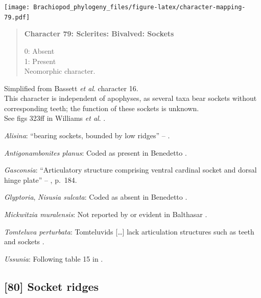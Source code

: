 \documentclass[openany]{book}
\begin{document}
\texttt{[image: Brachiopod\_phylogeny\_files/figure-latex/character-mapping-79.pdf]}

\begin{quote}
\textbf{Character 79: Sclerites: Bivalved: Sockets}

0: Absent\\
1: Present\\
Neomorphic character.
\end{quote}

Simplified from Bassett \emph{et al}.
\citeyearpar{Bassett2001Functionalmorphology} character 16.\\
This character is independent of apophyses, as several taxa bear sockets
without corresponding teeth; the function of these sockets is unknown.\\
See figs 323ff in Williams \emph{et al}.
\citeyearpar{Williams1997Introduction}.

\hypertarget{Alisina-coding-79}{}
\emph{Alisina}: ``bearing sockets, bounded by low ridges'' --
\citet{Williams2000LinguliformeaCraniiformea}.

\hypertarget{Antigonambonites_planus-coding-79}{}
\emph{Antigonambonites planus}: Coded as present in Benedetto
\citeyearpar{Benedetto2009iChaniella}.

\hypertarget{Gasconsia-coding-79}{}
\emph{Gasconsia}: ``Articulatory structure comprising ventral cardinal
socket and dorsal hinge plate'' --
\citet{Williams2000LinguliformeaCraniiformea}, p.~184.

\hypertarget{Glyptoria-coding-79}{}
\emph{Glyptoria}, \emph{Nisusia sulcata}: Coded as absent in Benedetto
\citeyearpar{Benedetto2009iChaniella}.

\hypertarget{Mickwitzia_muralensis-coding-79}{}
\emph{Mickwitzia muralensis}: Not reported by or evident in Balthasar
\citeyearpar{Balthasar2004Shellstructure}.

\hypertarget{Tomteluva_perturbata-coding-79}{}
\emph{Tomteluva perturbata}: Tomteluvids {[}\ldots{}{]} lack
articulation structures such as teeth and sockets
\citep{Streng2016Anew}.

\hypertarget{Ussunia-coding-79}{}
\emph{Ussunia}: Following table 15 in
\citet{Williams2000LinguliformeaCraniiformea}.

\subsection*{{[}80{]} Socket ridges}\label{socket-ridges}
\end{document}
